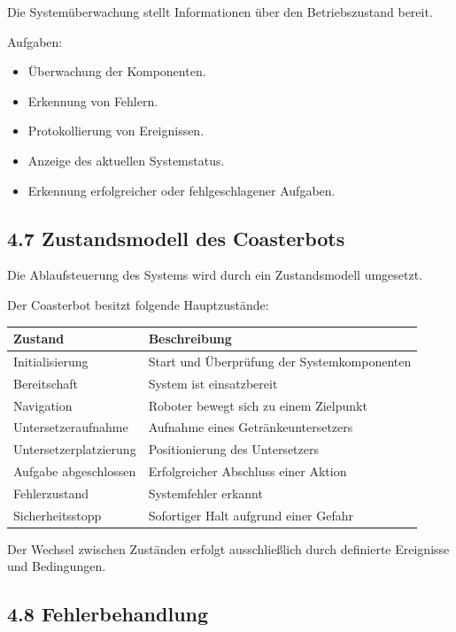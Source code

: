 \documentclass[
  a4paper,
  12pt,
  DIV=12,        %
  parskip=half,  %
  headings=small %
]{scrartcl}
\theoremstyle{definition}
\providecommand{\tightlist}{%
  \setlength{\itemsep}{0pt}\setlength{\parskip}{0pt}}
\theoremstyle{definition}
\providecommand{\tightlist}{%
  \setlength{\itemsep}{0pt}\setlength{\parskip}{0pt}}
\begin{document}
Die Systemüberwachung stellt Informationen über den Betriebszustand
bereit.

Aufgaben:

\begin{itemize}
\tightlist
\item
  Überwachung der Komponenten.
\item
  Erkennung von Fehlern.
\item
  Protokollierung von Ereignissen.
\item
  Anzeige des aktuellen Systemstatus.
\item
  Erkennung erfolgreicher oder fehlgeschlagener Aufgaben.
\end{itemize}

\subsection{4.7 Zustandsmodell des
Coasterbots}\label{zustandsmodell-des-coasterbots}

Die Ablaufsteuerung des Systems wird durch ein Zustandsmodell umgesetzt.

Der Coasterbot besitzt folgende Hauptzustände:

\begin{longtable}[]{@{}ll@{}}
\toprule\noalign{}
Zustand & Beschreibung \\
\midrule\noalign{}
\endhead
\bottomrule\noalign{}
\endlastfoot
Initialisierung & Start und Überprüfung der Systemkomponenten \\
Bereitschaft & System ist einsatzbereit \\
Navigation & Roboter bewegt sich zu einem Zielpunkt \\
Untersetzeraufnahme & Aufnahme eines Getränkeuntersetzers \\
Untersetzerplatzierung & Positionierung des Untersetzers \\
Aufgabe abgeschlossen & Erfolgreicher Abschluss einer Aktion \\
Fehlerzustand & Systemfehler erkannt \\
Sicherheitsstopp & Sofortiger Halt aufgrund einer Gefahr \\
\end{longtable}

Der Wechsel zwischen Zuständen erfolgt ausschließlich durch definierte
Ereignisse und Bedingungen.

\subsection{4.8 Fehlerbehandlung}\label{fehlerbehandlung}
\end{document}

